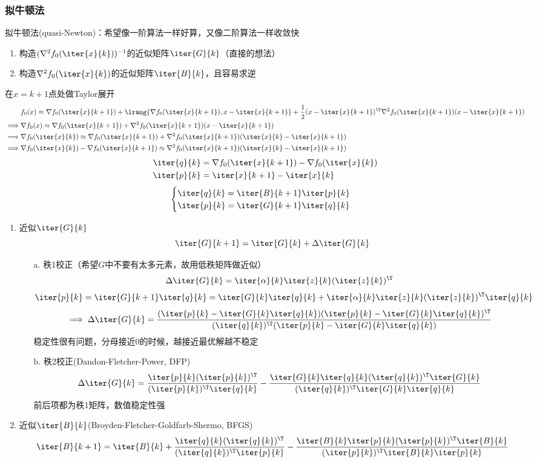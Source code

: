 \subsubsection{拟牛顿法}
拟牛顿法(quasi-Newton)：希望像一阶算法一样好算，又像二阶算法一样收敛快
\begin{enumerate}
    \item 构造$(\nabla^2f_0(\iter{x}{k}))^{-1}$的近似矩阵$\iter{G}{k}$（直接的想法）
    \item 构造$\nabla^2f_0(\iter{x}{k})$的近似矩阵$\iter{B}{k}$，且容易求逆
\end{enumerate}
在$x=k+1$点处做Taylor展开
\[\begin{aligned}
    \qquad & f_0(x)\approx\nabla f_0(\iter{x}{k+1})+\lrang{\nabla f_0(\iter{x}{k+1}),x-\iter{x}{k+1}}+\frac{1}{2}(x-\iter{x}{k+1})^\T\nabla^2 f_0(\iter{x}{k+1})(x-\iter{x}{k+1})\\
    \implies&\nabla f_0(x)\approx\nabla f_0(\iter{x}{k+1})+\nabla^2 f_0(\iter{x}{k+1})(x-\iter{x}{k+1})\\
    \implies&\nabla f_0(\iter{x}{k})\approx\nabla f_0(\iter{x}{k+1})+\nabla^2 f_0(\iter{x}{k+1})(\iter{x}{k}-\iter{x}{k+1})\\
    \implies&\nabla f_0(\iter{x}{k})-\nabla f_0(\iter{x}{k+1})\approx\nabla^2 f_0(\iter{x}{k+1})(\iter{x}{k}-\iter{x}{k+1})
\end{aligned}\]
\[\begin{aligned}
    \iter{q}{k}&=\nabla f_0(\iter{x}{k+1})-\nabla f_0(\iter{x}{k})\\
    \iter{p}{k}&=\iter{x}{k+1}-\iter{x}{k}
\end{aligned}\]
\[\begin{cases}
    \iter{q}{k}=\iter{B}{k+1}\iter{p}{k}\\
    \iter{p}{k}=\iter{G}{k+1}\iter{q}{k}
\end{cases}\]
\begin{enumerate}
\item 近似$\iter{G}{k}$
\[\iter{G}{k+1}=\iter{G}{k}+\Delta\iter{G}{k}\]
\begin{itemize}
    \item [a.]秩1校正（希望$G$中不要有太多元素，故用低秩矩阵做近似）
    \[\Delta\iter{G}{k}=\iter{\alpha}{k}\iter{z}{k}(\iter{z}{k})^\T\]
    \[\iter{p}{k}=\iter{G}{k+1}\iter{q}{k}=\iter{G}{k}\iter{q}{k}+\iter{\alpha}{k}\iter{z}{k}(\iter{z}{k})^\T\iter{q}{k}\]
    \[\implies\Delta\iter{G}{k}=\frac{(\iter{p}{k}-\iter{G}{k}\iter{q}{k})(\iter{p}{k}-\iter{G}{k}\iter{q}{k})^\T}{(\iter{q}{k})^\T(\iter{p}{k}-\iter{G}{k}\iter{q}{k})}\]
    稳定性很有问题，分母接近0的时候，越接近最优解越不稳定
    \item [b.]秩2校正(Dandon-Fletcher-Power, DFP)
    \[\Delta\iter{G}{k}=\frac{\iter{p}{k}(\iter{p}{k})^\T}{(\iter{p}{k})^\T\iter{q}{k}}-\frac{\iter{G}{k}\iter{q}{k}(\iter{q}{k})^\T\iter{G}{k}}{(\iter{q}{k})^\T\iter{G}{k}\iter{q}{k}}\]
    前后项都为秩1矩阵，数值稳定性强
\end{itemize}
\item 近似$\iter{B}{k}$(Broyden-Fletcher-Goldfarb-Shermo, BFGS)
\[\iter{B}{k+1}=\iter{B}{k}+\frac{\iter{q}{k}(\iter{q}{k})^\T}{(\iter{q}{k})^\T\iter{p}{k}}-\frac{\iter{B}{k}\iter{p}{k}(\iter{p}{k})^\T\iter{B}{k}}{(\iter{p}{k})^\T\iter{B}{k}\iter{p}{k}}\]
\end{enumerate}
